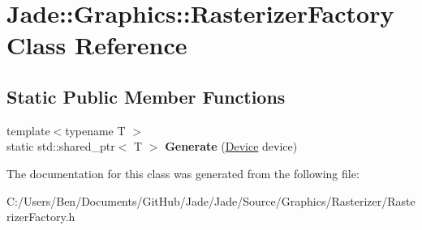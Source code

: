 \hypertarget{class_jade_1_1_graphics_1_1_rasterizer_factory}{}\section{Jade\+:\+:Graphics\+:\+:Rasterizer\+Factory Class Reference}
\label{class_jade_1_1_graphics_1_1_rasterizer_factory}
\subsection*{Static Public Member Functions}
\begin{DoxyCompactItemize}
\item 
\hypertarget{class_jade_1_1_graphics_1_1_rasterizer_factory_ab9d99dc1f3e7dabfb08cd6497efb8484}{}{\footnotesize template$<$typename T $>$ }\\static std\+::shared\+\_\+ptr$<$ T $>$ {\bfseries Generate} (\hyperlink{class_jade_1_1_graphics_1_1_device}{Device} device)\label{class_jade_1_1_graphics_1_1_rasterizer_factory_ab9d99dc1f3e7dabfb08cd6497efb8484}

\end{DoxyCompactItemize}


The documentation for this class was generated from the following file\+:\begin{DoxyCompactItemize}
\item 
C\+:/\+Users/\+Ben/\+Documents/\+Git\+Hub/\+Jade/\+Jade/\+Source/\+Graphics/\+Rasterizer/Rasterizer\+Factory.\+h\end{DoxyCompactItemize}
